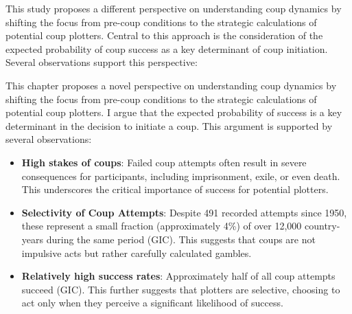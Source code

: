 \documentclass[
  12pt,
]{report}
\begin{document}
This study proposes a different perspective on understanding coup
dynamics by shifting the focus from pre-coup conditions to the strategic
calculations of potential coup plotters. Central to this approach is the
consideration of the expected probability of coup success as a key
determinant of coup initiation. Several observations support this
perspective:

This chapter proposes a novel perspective on understanding coup dynamics
by shifting the focus from pre-coup conditions to the strategic
calculations of potential coup plotters. I argue that the expected
probability of success is a key determinant in the decision to initiate
a coup. This argument is supported by several observations:

\begin{itemize}
\item
  \textbf{High stakes of coups}: Failed coup attempts often result in
  severe consequences for participants, including imprisonment, exile,
  or even death. This underscores the critical importance of success for
  potential plotters.
\item
  \textbf{Selectivity of Coup Attempts}: Despite 491 recorded attempts
  since 1950, these represent a small fraction (approximately 4\%) of
  over 12,000 country-years during the same period (GIC). This suggests
  that coups are not impulsive acts but rather carefully calculated
  gambles.
\item
  \textbf{Relatively high success rates}: Approximately half of all coup
  attempts succeed (GIC). This further suggests that plotters are
  selective, choosing to act only when they perceive a significant
  likelihood of success.
\end{itemize}
\end{document}
